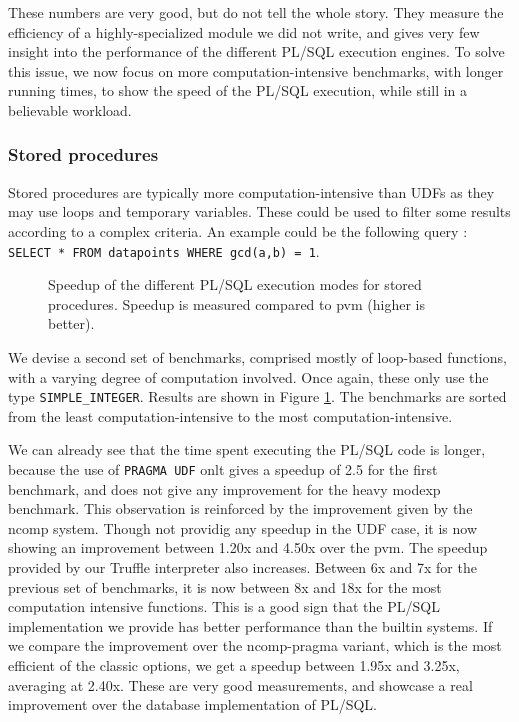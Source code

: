 \documentclass[twoside,11pt,a4paper]{article}
\newcommand{\sql}[1]{\texttt{#1}}
\newcommand{\pls}[1]{\texttt{#1}}
\newcommand{\plstype}[1]{\pls{#1}}
\newcommand{\simpleint}{\plstype{SIMPLE\_INTEGER}}
\newcommand{\benchsystem}[1]{\textsf{#1}}
\newcommand{\pvm}{\benchsystem{pvm}}
\newcommand{\ncomp}{\benchsystem{ncomp}}
\newcommand{\ncpg}{\benchsystem{ncomp-pragma}}
\newcommand{\bench}[1]{\textsf{#1}}
\begin{document}
These numbers are very good, but do not tell the whole story. They measure the efficiency of a highly-specialized module we did not write, and gives very few insight into the performance of the different PL/SQL execution engines. To solve this issue, we now focus on more computation-intensive benchmarks, with longer running times, to show the speed of the PL/SQL execution, while still in a believable workload.

\subsubsection{Stored procedures}

Stored procedures are typically more computation-intensive than UDFs as they may use loops and temporary variables. These could be used to filter some results according to a complex criteria. An example could be the following query : \sql{SELECT * FROM datapoints WHERE gcd(a,b) = 1}.

\begin{figure}[tp]
	\centering
	\caption{Speedup of the different PL/SQL execution modes for stored procedures. Speedup is measured compared to \pvm{} (higher is better).}
	\label{fig:exp1b}
\end{figure}

We devise a second set of benchmarks, comprised mostly of loop-based functions, with a varying degree of computation involved. Once again, these only use the type \simpleint{}. Results are shown in Figure \ref{fig:exp1b}. The benchmarks are sorted from the least computation-intensive to the most computation-intensive.

We can already see that the time spent executing the PL/SQL code is longer, because the use of \pls{PRAGMA UDF} onlt gives a speedup of 2.5 for the first benchmark, and does not give any improvement for the heavy \bench{modexp} benchmark. This observation is reinforced by the improvement given by the \ncomp{} system. Though not providig any speedup in the UDF case, it is now showing an improvement between 1.20x and 4.50x  over the \pvm{}. The speedup provided by our Truffle interpreter also increases. Between 6x and 7x for the previous set of benchmarks, it is now between 8x and 18x for the most computation intensive functions. This is a good sign that the PL/SQL implementation we provide has better performance than the builtin systems. If we compare the improvement over the \ncpg{} variant, which is the most efficient of the classic options, we get a speedup between 1.95x and 3.25x, averaging at 2.40x. These are very good measurements, and showcase a real improvement over the database implementation of PL/SQL.
\end{document}
